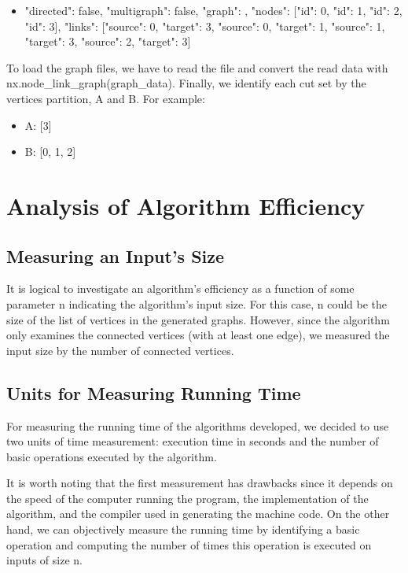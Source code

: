 \documentclass[]{revdetua}
\begin{document}
\begin{itemize}
\item {"directed": false, "multigraph": false, "graph": {}, "nodes": [{"id": 0}, {"id": 1}, {"id": 2}, {"id": 3}], "links": [{"source": 0, "target": 3}, {"source": 0, "target": 1}, {"source": 1, "target": 3}, {"source": 2, "target": 3}]}
\end{itemize}

To load the graph files, we have to read the file and convert the read data with nx.node\_link\_graph(graph\_data). Finally, we identify each cut set by the vertices partition, A and B. For example:

\begin{itemize}
\item A:  [3]
\item B:  [0, 1, 2]
\end{itemize}

\section{Analysis of Algorithm Efficiency}

\subsection{Measuring an Input’s Size}

It is logical to investigate an algorithm’s efficiency as a function of some parameter n indicating the algorithm’s input size. For this case, n could be the size of the list of vertices in the generated graphs. However, since the algorithm only examines the connected vertices (with at least one edge), we measured the input size by the number of connected vertices.

\subsection{Units for Measuring Running Time}

For measuring the running time of the algorithms developed, we decided to use two units of time measurement: execution time in seconds and the number of basic operations executed by the algorithm. 

It is worth noting that the first measurement has drawbacks since it depends on the speed of the computer running the program, the implementation of the algorithm, and the compiler used in generating the machine code. On the other hand, we can objectively measure the running time by identifying a basic operation and computing the number of times this operation is executed on inputs of size n. 
\end{document}
